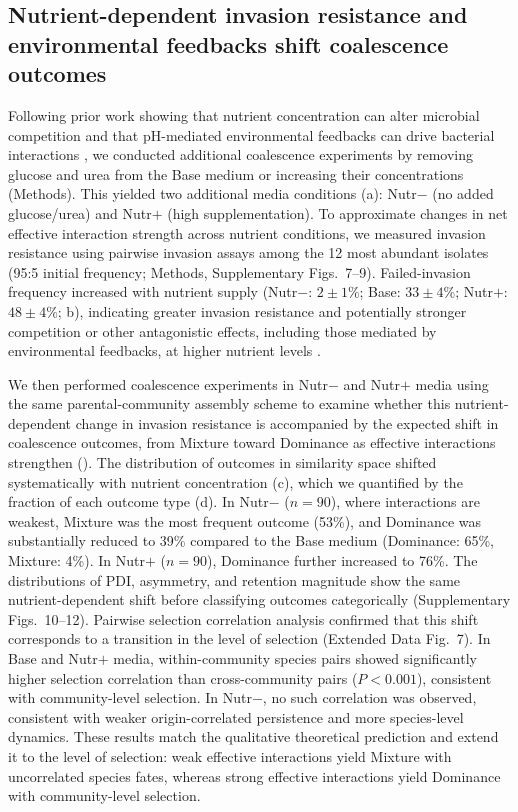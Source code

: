\subsection{Nutrient-dependent invasion resistance and environmental feedbacks shift coalescence outcomes}
\label{sec:results:nutrient_experiment}

Following prior work showing that nutrient concentration can alter microbial competition and that pH-mediated environmental feedbacks can drive bacterial interactions \citep{Hu2022,Ratzke2018,Ratzke2020,Hu2025}, we conducted additional coalescence experiments by removing glucose and urea from the Base medium or increasing their concentrations (Methods). This yielded two additional media conditions (a): Nutr$-$ (no added glucose/urea) and Nutr$+$ (high supplementation). To approximate changes in net effective interaction strength across nutrient conditions, we measured invasion resistance using pairwise invasion assays among the 12 most abundant isolates (95:5 initial frequency; Methods, Supplementary Figs.~7--9). Failed-invasion frequency increased with nutrient supply (Nutr$-$: $2 \pm 1\%$; Base: $33 \pm 4\%$; Nutr$+$: $48 \pm 4\%$; b), indicating greater invasion resistance and potentially stronger competition or other antagonistic effects, including those mediated by environmental feedbacks, at higher nutrient levels \citep{Ratzke2018,Ratzke2020}.

We then performed coalescence experiments in Nutr$-$ and Nutr$+$ media using the same parental-community assembly scheme to examine whether this nutrient-dependent change in invasion resistance is accompanied by the expected shift in coalescence outcomes, from Mixture toward Dominance as effective interactions strengthen (). The distribution of outcomes in similarity space shifted systematically with nutrient concentration (c), which we quantified by the fraction of each outcome type (d). In Nutr$-$ ($n = 90$), where interactions are weakest, Mixture was the most frequent outcome (53\%), and Dominance was substantially reduced to 39\% compared to the Base medium (Dominance: 65\%, Mixture: 4\%). In Nutr$+$ ($n = 90$), Dominance further increased to 76\%. The distributions of PDI, asymmetry, and retention magnitude show the same nutrient-dependent shift before classifying outcomes categorically (Supplementary Figs.~10--12). Pairwise selection correlation analysis confirmed that this shift corresponds to a transition in the level of selection (Extended Data Fig.~7). In Base and Nutr$+$ media, within-community species pairs showed significantly higher selection correlation than cross-community pairs ($P < 0.001$), consistent with community-level selection. In Nutr$-$, no such correlation was observed, consistent with weaker origin-correlated persistence and more species-level dynamics. These results match the qualitative theoretical prediction and extend it to the level of selection: weak effective interactions yield Mixture with uncorrelated species fates, whereas strong effective interactions yield Dominance with community-level selection.

